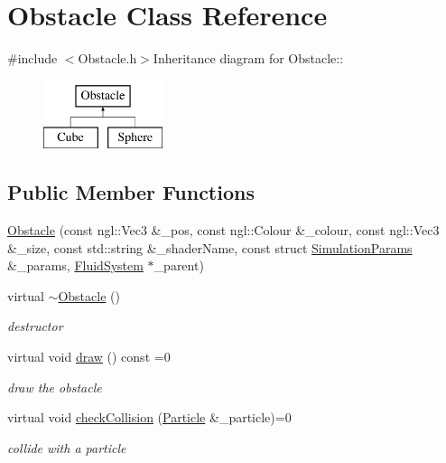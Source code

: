 \hypertarget{classObstacle}{
\section{Obstacle Class Reference}
\label{classObstacle}
}


{\ttfamily \#include $<$Obstacle.h$>$}Inheritance diagram for Obstacle::\begin{figure}[H]
\begin{center}
\leavevmode
\includegraphics[height=2cm]{classObstacle}
\end{center}
\end{figure}
\subsection*{Public Member Functions}
\begin{DoxyCompactItemize}
\item 
\hyperlink{classObstacle_aa896fb4d70044e9421ccb9c757ed2d3c}{Obstacle} (const ngl::Vec3 \&\_\-pos, const ngl::Colour \&\_\-colour, const ngl::Vec3 \&\_\-size, const std::string \&\_\-shaderName, const struct \hyperlink{structSimulationParams}{SimulationParams} \&\_\-params, \hyperlink{classFluidSystem}{FluidSystem} $\ast$\_\-parent)
\item 
virtual \hyperlink{classObstacle_af2f9cc9c6cff75dca0974fd5ac4f71a9}{$\sim$Obstacle} ()
\begin{DoxyCompactList}\small\item\em destructor \item\end{DoxyCompactList}\item 
virtual void \hyperlink{classObstacle_a7476b22bcd25e3731a0ef2aa5324afa0}{draw} () const =0
\begin{DoxyCompactList}\small\item\em draw the obstacle \item\end{DoxyCompactList}\item 
virtual void \hyperlink{classObstacle_ae35a1937df593d5caf25c5545acbaffd}{checkCollision} (\hyperlink{classParticle}{Particle} \&\_\-particle)=0
\begin{DoxyCompactList}\small\item\em collide with a particle \item\end{DoxyCompactList}\end{DoxyCompactItemize}

